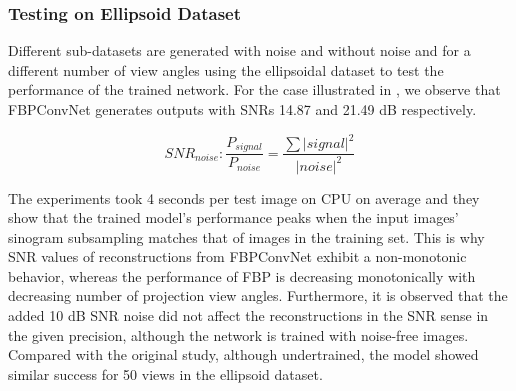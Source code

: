 \documentclass[journal, onecolumn, 11pt]{IEEEtran}
\begin{document}
\vfill\null\newpage
\subsubsection{Testing on Ellipsoid Dataset}

Different sub-datasets are generated with noise and without noise and for a different number of view angles using the ellipsoidal dataset to test the performance of the trained network. For the case illustrated in , we observe that FBPConvNet generates outputs with SNRs 14.87 and 21.49 dB respectively. 


\begin{table}[h]
\caption{\label{tab:tabname}Experiment results for training configuration described in . \newline * Noise SNR is described in }
\end{table}

\begin{equation}
    SNR_{noise}: \frac{P_{signal}}{P_{noise}} = \frac{\sum |signal|^2}{|noise|^2
    \label{eq:noisesnr}} 
\end{equation}

The experiments took 4 seconds per test image on CPU on average and they show that the trained model's performance peaks when  
the input images' sinogram subsampling matches that of images in the training set. This is why SNR values of reconstructions from FBPConvNet exhibit a non-monotonic behavior, whereas the performance of FBP is decreasing monotonically with decreasing number of projection view angles. Furthermore, it is observed that the added 10 dB SNR noise did not affect the reconstructions in the SNR sense in the given precision, although the network is trained with noise-free images. Compared with the original study, although undertrained, the model showed similar success for 50 views in the ellipsoid dataset. 
\end{document}
